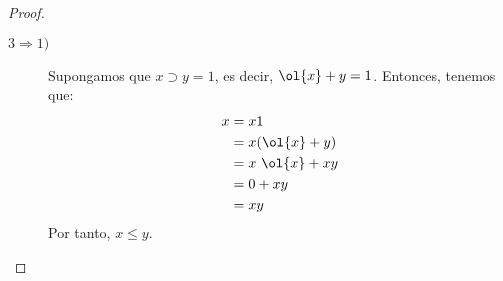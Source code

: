 \begin{ejercicio}
\begin{proof}
\begin{description}
            \item[$3\Longrightarrow 1)$]
            
            Supongamos que $x\supset y=1$, es decir, $\ol{x}+y=1$. Entonces, tenemos que:
            \begin{align*}
                x &= x1\\
                &= x(\ol{x}+y)\\
                &= x~\ol{x} + xy\\
                &= 0 + xy\\
                &= xy
            \end{align*}
            Por tanto, $x\leq y$.
        \end{description}
    \end{proof}
\end{ejercicio}



